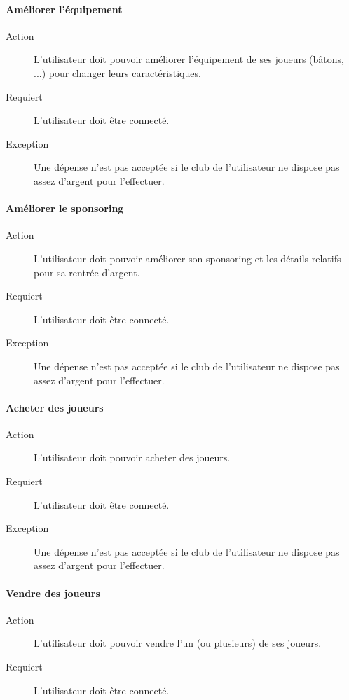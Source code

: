 \documentclass[a4paper]{article}
\begin{document}
\paragraph{Améliorer l'équipement}
\begin{description}
\item[Action] L'\gls{utilisateur} doit pouvoir améliorer l'équipement de ses joueurs (bâtons, ...) pour changer leurs caractéristiques.
\item[Requiert] L'\gls{utilisateur} doit être connecté.
\item[Exception] Une dépense n'est pas acceptée si le \gls{club} de l'\gls{utilisateur} ne dispose pas assez d'argent pour l'effectuer.
\end{description}
\paragraph{Améliorer le sponsoring}
\begin{description}
\item[Action] L'\gls{utilisateur} doit pouvoir améliorer son sponsoring et les détails relatifs pour sa rentrée d'argent.
\item[Requiert] L'\gls{utilisateur} doit être connecté.
\item[Exception] Une dépense n'est pas acceptée si le \gls{club} de l'\gls{utilisateur} ne dispose pas assez d'argent pour l'effectuer.
\end{description}
\paragraph{Acheter des joueurs}
\begin{description}
\item[Action] L'\gls{utilisateur} doit pouvoir acheter des joueurs.
\item[Requiert] L'\gls{utilisateur} doit être connecté.
\item[Exception] Une dépense n'est pas acceptée si le \gls{club} de l'\gls{utilisateur} ne dispose pas assez d'argent pour l'effectuer.
\end{description}
\paragraph{Vendre des joueurs}
\begin{description}
\item[Action] L'\gls{utilisateur} doit pouvoir vendre l'un (ou plusieurs) de ses joueurs.
\item[Requiert] L'\gls{utilisateur} doit être connecté.
\end{description}
\end{document}

